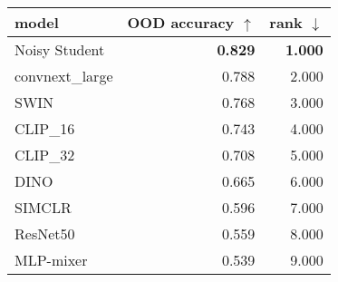 \begin{tabular}{lrr}
\toprule
          model & OOD accuracy $\uparrow$ & rank $\downarrow$ \\
\midrule
  Noisy Student &          \textbf{0.829} &    \textbf{1.000} \\
convnext\_large &                   0.788 &             2.000 \\
           SWIN &                   0.768 &             3.000 \\
       CLIP\_16 &                   0.743 &             4.000 \\
       CLIP\_32 &                   0.708 &             5.000 \\
           DINO &                   0.665 &             6.000 \\
         SIMCLR &                   0.596 &             7.000 \\
       ResNet50 &                   0.559 &             8.000 \\
      MLP-mixer &                   0.539 &             9.000 \\
\bottomrule
\end{tabular}

